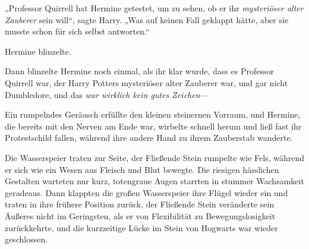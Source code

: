 „Professor Quirrell hat Hermine getestet, um zu sehen, ob er ihr \emph{mysteriöser alter Zauberer} sein will“, sagte Harry.
„Was auf keinen Fall geklappt hätte, aber sie musste schon für sich selbst antworten.“

Hermine blinzelte.

Dann blinzelte Hermine noch einmal, als ihr klar wurde, dass es Professor Quirrell war, der Harry Potters mysteriöser alter Zauberer war, und gar nicht Dumbledore, und das \emph{war wirklich kein gutes Zeichen}—

Ein rumpelndes Geräusch erfüllte den kleinen steinernen Vorraum, und Hermine, die bereits mit den Nerven am Ende war, wirbelte schnell herum und ließ fast ihr Protestschild fallen, während ihre andere Hand zu ihrem Zauberstab wanderte.

Die Wasserspeier traten zur Seite, der Fließende Stein rumpelte wie Fels, während er sich wie ein Wesen aus Fleisch und Blut bewegte. Die riesigen hässlichen Gestalten warteten nur kurz, totengraue Augen starrten in stummer Wachsamkeit geradeaus. Dann klappten die großen Wasserspeier ihre Flügel wieder ein und traten in ihre frühere Position zurück, der Fließende Stein veränderte sein Äußeres nicht im Geringsten, als er von Flexibilität zu Bewegungslosigkeit zurückkehrte, und die kurzzeitige Lücke im Stein von Hogwarts war wieder geschlossen.

